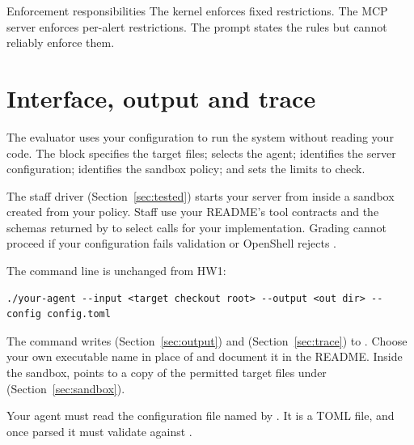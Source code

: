 \documentclass[9pt,letterpaper]{article}
\begin{document}
\begin{required}{Enforcement responsibilities}
The kernel enforces fixed restrictions. The MCP server enforces per-alert
restrictions. The prompt states the rules but cannot reliably enforce them.
\end{required}

\section{Interface, output and trace}\label{sec:interface}

The evaluator uses your configuration to run the system without reading your
code. The \code{[scan]} block specifies the target files; 
selects the agent;  identifies the server configuration;
 identifies the sandbox policy; and \code{[budget]} sets
the limits to check.

The staff driver (Section~\ref{sec:tested}) starts your server from
 inside a sandbox created from your policy. Staff use your README's
tool contracts and the schemas returned by  to select calls for
your implementation. Grading cannot proceed if your configuration fails
 validation or OpenShell rejects .

The command line is unchanged from HW1:
\begin{verbatim}
./your-agent --input <target checkout root> --output <out dir> --config config.toml
\end{verbatim}
The command writes  (Section~\ref{sec:output}) and
 (Section~\ref{sec:trace}) to . Choose your own
executable name in place of  and document it in the README.
Inside the sandbox,  points to a copy of the permitted target files
under  (Section~\ref{sec:sandbox}).

Your agent must read the configuration file named by . It is a TOML
file, and once parsed it must validate against .
\end{document}

